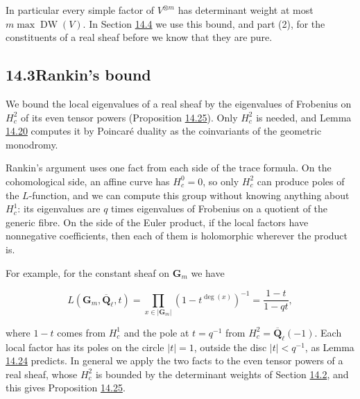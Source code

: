 \documentclass[11pt]{article}
\begin{document}
\label{bp63}%
In particular every simple factor of \(V^{\otimes m}\) has determinant weight at most \(m\max\operatorname{DW}(V)\). In Section \hyperref[bp80]{14.4} we use this bound, and part (2), for the constituents of a real sheaf before we know that they are pure.



\subsection*{\texorpdfstring{14.3\quad Rankin's bound}{14.3 Rankin's bound}}
\label{bp64}%
\label{bp65}%
We bound the local eigenvalues of a real sheaf by the eigenvalues of Frobenius on \(H^2_c\) of its even tensor powers (Proposition \hyperref[bp78]{14.25}). Only \(H^2_c\) is needed, and Lemma \hyperref[bp66]{14.20} computes it by Poincaré duality as the coinvariants of the geometric monodromy.

Rankin's argument uses one fact from each side of the trace formula. On the cohomological side, an affine curve has \(H^0_c=0\), so only \(H^2_c\) can produce poles of the \(L\)-function, and we can compute this group without knowing anything about \(H^1_c\): its eigenvalues are \(q\) times eigenvalues of Frobenius on a quotient of the generic fibre. On the side of the Euler product, if the local factors have nonnegative coefficients, then each of them is holomorphic wherever the product is.

For example, for the constant sheaf on \(\mathbf G_m\) we have

\[
L(\mathbf G_m,\overline{\mathbf Q}_\ell,t)=\prod_{x\in|\mathbf G_m|}(1-t^{\deg(x)})^{-1}
=\frac{1-t}{1-qt},
\]

where \(1-t\) comes from \(H^1_c\) and the pole at \(t=q^{-1}\) from \(H^2_c=\overline{\mathbf Q}_\ell(-1)\). Each local factor has its poles on the circle \(|t|=1\), outside the disc \(|t|<q^{-1}\), as Lemma \hyperref[bp75]{14.24} predicts. In general we apply the two facts to the even tensor powers of a real sheaf, whose \(H^2_c\) is bounded by the determinant weights of Section \hyperref[bp31]{14.2}, and this gives Proposition \hyperref[bp78]{14.25}.
\end{document}
